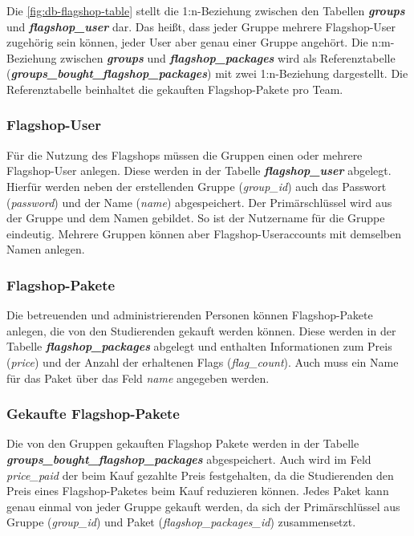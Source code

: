 Die \autoref{fig:db-flagshop-table} stellt die 1:n-Beziehung zwischen den Tabellen \textbf{\textit{groups}} und \textbf{\textit{flagshop\_user}} dar. Das heißt, dass jeder Gruppe mehrere Flagshop-User zugehörig sein können, jeder User aber genau einer Gruppe angehört. Die n:m-Beziehung zwischen \textbf{\textit{groups}} und \linebreak \textbf{\textit{flagshop\_packages}} wird als Referenztabelle (\textbf{\textit{groups\_bought\_flagshop\_packages}}) mit zwei 1:n-Beziehung dargestellt. Die Referenztabelle beinhaltet die gekauften Flagshop-Pakete pro Team.

\subsubsection{Flagshop-User}
Für die Nutzung des Flagshops müssen die Gruppen einen oder mehrere Flagshop-User anlegen. Diese werden in der Tabelle \textbf{\textit{flagshop\_user}} abgelegt. Hierfür werden neben der erstellenden Gruppe (\textit{group\_id}) auch das Passwort (\textit{password}) und der Name (\textit{name}) abgespeichert. Der Primärschlüssel wird aus der Gruppe und dem Namen gebildet. So ist der Nutzername für die Gruppe eindeutig. Mehrere Gruppen können aber Flagshop-Useraccounts mit demselben Namen anlegen.

\subsubsection{Flagshop-Pakete}
Die betreuenden und administrierenden Personen können Flagshop-Pakete anlegen, die von den Studierenden gekauft werden können. Diese werden in der Tabelle \textbf{\textit{flagshop\_packages}} abgelegt und enthalten Informationen zum Preis (\textit{price}) und der Anzahl der erhaltenen Flags (\textit{flag\_count}). Auch muss ein Name für das Paket über das Feld \textit{name} angegeben werden.

\subsubsection{Gekaufte Flagshop-Pakete}
Die von den Gruppen gekauften Flagshop Pakete werden in der Tabelle \linebreak \textbf{\textit{groups\_bought\_flagshop\_packages}} abgespeichert. Auch wird im Feld \textit{price\_paid} der beim Kauf gezahlte Preis festgehalten, da die Studierenden den Preis eines Flagshop-Paketes beim Kauf reduzieren können. Jedes Paket kann genau einmal von jeder Gruppe gekauft werden, da sich der Primärschlüssel aus Gruppe (\textit{group\_id}) und Paket (\textit{flagshop\_packages\_id}) \linebreak zusammensetzt.

